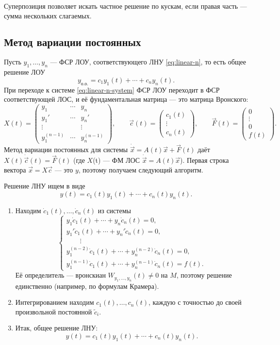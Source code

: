 \documentclass[12pt,a4paper]{article}
\numberwithin{equation}{section}
\newcommand{\vect}[1]{\vec{#1}}
\begin{document}
Суперпозиция позволяет искать частное решение по кускам, если правая часть --- сумма нескольких слагаемых.

\subsection{Метод вариации постоянных}

Пусть \(y_1,\ldots,y_n\) --- ФСР ЛОУ, соответствующего ЛНУ \eqref{eq:linear-n}, то есть общее решение ЛОУ
\[
y_{\text{о.о.}}=c_1y_1(t)+\cdots+c_ny_n(t).
\]
При переходе к системе \eqref{eq:linear-n-system} ФСР ЛОУ переходит в ФСР соответствующей ЛОС, и её фундаментальная матрица --- это матрица Вронского:
\[
X(t)=
\begin{pmatrix}
y_1&\cdots&y_n\\
y_1'&\cdots&y_n'\\
\vdots&&\vdots\\
y_1^{(n-1)}&\cdots&y_n^{(n-1)}
\end{pmatrix},
\qquad
\vect{c}(t)=
\begin{pmatrix}c_1(t)\\\vdots\\c_n(t)\end{pmatrix},
\qquad
\vect{F}(t)=
\begin{pmatrix}0\\\vdots\\0\\f(t)\end{pmatrix}.
\]
Метод вариации постоянных для системы \(\dot{\vect{x}}=A(t)\vect{x}+\vect{F}(t)\) даёт \(X(t)\dot{\vect{c}}(t)=\vect{F}(t)\) (где \(X\)(t) --- ФМ ЛОС \(\dot{\vect{x}}=A(t)\vect{x}\)). Первая строка вектора \(\vect{x}=X\vect{c}\) --- это \(y\), поэтому получаем следующий алгоритм.

\begin{theoremHSE}
Решение ЛНУ ищем в виде
\[
y(t)=c_1(t)y_1(t)+\cdots+c_n(t)y_n(t).
\]
\begin{enumerate}
\item Находим \(\dot c_1(t),\ldots,\dot c_n(t)\) из системы
\[
\begin{cases}
y_1\dot c_1(t)+\cdots+y_n\dot c_n(t)=0,\\
y_1'\dot c_1(t)+\cdots+y_n'\dot c_n(t)=0,\\
\qquad\vdots\\
y_1^{(n-2)}\dot c_1(t)+\cdots+y_n^{(n-2)}\dot c_n(t)=0,\\
y_1^{(n-1)}\dot c_1(t)+\cdots+y_n^{(n-1)}\dot c_n(t)=f(t).
\end{cases}
\]
Её определитель --- вронскиан \(W_{y_1,\ldots,y_n}(t)\neq0\) на \(M\), поэтому решение единственно (например, по формулам Крамера).
\item Интегрированием находим \(c_1(t),\ldots,c_n(t)\), каждую с точностью до своей произвольной постоянной \(\tilde c_i\).
\item Итак, общее решение ЛНУ:
\[
y(t)=c_1(t)y_1(t)+\cdots+c_n(t)y_n(t).
\]
\end{enumerate}
\end{theoremHSE}
\end{document}
